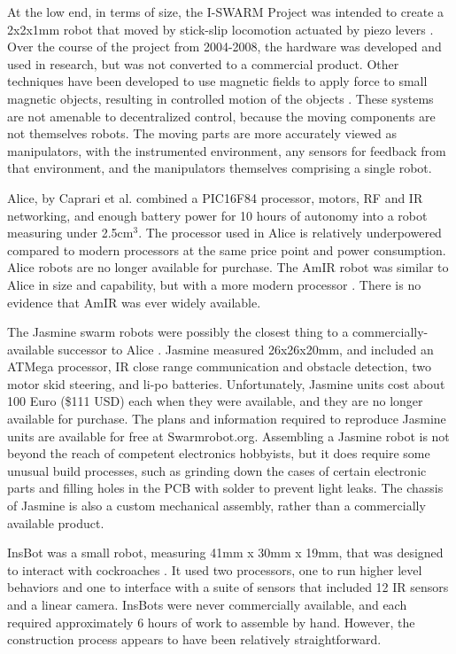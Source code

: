 \documentclass[]{article}
\begin{document}
At the low end, in terms of size, the I-SWARM Project was intended to create a 2x2x1mm robot that moved by stick-slip locomotion actuated by piezo levers \cite{seyfried2005swarm}. 
Over the course of the project from 2004-2008, the hardware was developed and used in research, but was not converted to a commercial product.
Other techniques have been developed to use magnetic fields to apply force to small magnetic objects, resulting in controlled motion of the objects \cite{floyd2008untethered, pelrine2012diamagnetically}.
These systems are not amenable to decentralized control, because the moving components are not themselves robots. 
The moving parts are more accurately viewed as manipulators, with the instrumented environment, any sensors for feedback from that environment, and the manipulators themselves comprising a single robot. 

Alice, by Caprari et al. \cite{caprari1998autonomous} combined a PIC16F84 processor, motors, RF and IR networking, and enough battery power for 10 hours of autonomy into a robot measuring under 2.5cm$^3$. 
The processor used in Alice is relatively underpowered compared to modern processors at the same price point and power consumption. 
Alice robots are no longer available for purchase. 
The AmIR robot was similar to Alice in size and capability, but with a more modern processor \cite{arvin2009development}.
There is no evidence that AmIR was ever widely available.

The Jasmine swarm robots were possibly the closest thing to a commercially-available successor to Alice  \cite{kernbach2011swarmrobot}.
Jasmine measured 26x26x20mm, and included an ATMega processor, IR close range communication and obstacle detection, two motor skid steering, and li-po batteries.
Unfortunately, Jasmine units cost about 100 Euro (\$111 USD) each when they were available, and they are no longer available for purchase. 
The plans and information required to reproduce Jasmine units are available for free at Swarmrobot.org.
Assembling a Jasmine robot is not beyond the reach of competent electronics hobbyists, but it does require some unusual build processes, such as grinding down the cases of certain electronic parts and filling holes in the PCB with solder to prevent light leaks. 
The chassis of Jasmine is also a custom mechanical assembly, rather than a commercially available product. 

InsBot was a small robot, measuring 41mm x 30mm x 19mm, that was designed to interact with cockroaches \cite{colot2004insbot}.
It used two processors, one to run higher level behaviors and one to interface with a suite of sensors that included 12 IR sensors and a linear camera. 
InsBots were never commercially available, and each required approximately 6 hours of work to assemble by hand. 
However, the construction process appears to have been relatively straightforward. 
\end{document}
